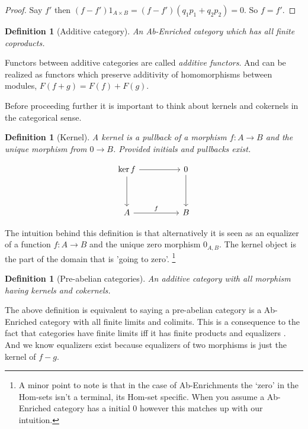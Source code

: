 \documentclass[12pt]{article}
\numberwithin{equation}{section}
\newcounter{dummy} \numberwithin{dummy}{section}
\newtheorem{definition}[dummy]{Definition}
\begin{document}
\begin{appendices}
\begin{proof}
		Say $f'$ then $(f-f')1_{A \times B}=(f-f')(q_1p_1+q_2p_2)=0$. So $f=f'$.
		
		
	\end{proof}
	
	
	\begin{definition}[Additive category]
		An Ab-Enriched category which has all finite coproducts.
	\end{definition}
	
	Functors between additive categories are called \textit{additive functors}. And can be realized as functors which preserve additivity of homomorphisms between modules, $F(f+g)=F(f)+F(g).$
	
	Before proceeding further it is important to think about kernels and cokernels in the categorical sense.
	\begin{definition}[Kernel]
		A kernel is a pullback of a morphism $f:A \to B$ and the unique morphism from $0 \to B$. Provided initials and pullbacks exist.
		
		\[\begin{tikzcd}
			{\ker f} && 0 \\
			\\
			A && B
			\arrow["f", from=3-1, to=3-3]
			\arrow[from=1-3, to=3-3]
			\arrow[from=1-1, to=1-3]
			\arrow[from=1-1, to=3-1]
		\end{tikzcd}\]
	\end{definition}
	The intuition behind this definition is that alternatively it is seen as an equalizer of a function $f:A \to B$ and the unique zero morphism $0_{A,B}$. The kernel object is the part of the domain that is 'going to zero'. \footnote{A minor point to note is that in the case of Ab-Enrichments the `zero' in the Hom-sets isn't a terminal, its Hom-set specific. When you assume a Ab-Enriched category has a initial 0 however this matches up with our intuition.}
	
	
	\begin{definition}[Pre-abelian categories]
		An additive category with all morphism having kernels and cokernels.
	\end{definition}
	The above definition is equivalent to saying a pre-abelian category is a Ab-Enriched category with all finite limits and colimits. This is a consequence to the fact that categories have finite limits iff it has finite products and equalizers \cite[Prop.~5.21]{Awodey}. And we know equalizers exist because equalizers of two morphisms is just the kernel of $f-g$.
	
	
	

\end{appendices}
\end{document}
